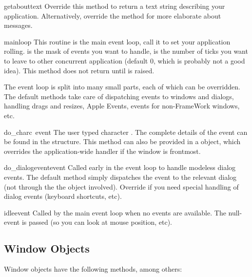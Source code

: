 \begin{funcdesc}{getabouttext}{}
Override this method to return a text string describing your
application. Alternatively, override the  method for
more elaborate about messages.
\end{funcdesc}

\begin{funcdesc}{mainloop}{}
This routine is the main event loop, call it to set your application
rolling.  is the mask of events you want to handle,
 is the number of ticks you want to leave to other
concurrent application (default 0, which is probably not a good
idea). This method does not return until  is raised.

The event loop is split into many small parts, each of which can be
overridden. The default methods take care of dispatching events to
windows and dialogs, handling drags and resizes, Apple Events, events
for non-FrameWork windows, etc.
\end{funcdesc}

\begin{funcdesc}{do_char}{c\, event}
The user typed character . The complete details of the event
can be found in the  structure. This method can also be
provided in a  object, which overrides the
application-wide handler if the window is frontmost.
\end{funcdesc}

\begin{funcdesc}{do_dialogevent}{event}
Called early in the event loop to handle modeless dialog events. The
default method simply dispatches the event to the relevant dialog (not
through the the  object involved). Override if you
need special handling of dialog events (keyboard shortcuts, etc).
\end{funcdesc}

\begin{funcdesc}{idle}{event}
Called by the main event loop when no events are available. The
null-event is passed (so you can look at mouse position, etc).
\end{funcdesc}

\subsection{Window Objects}

Window objects have the following methods, among others:


